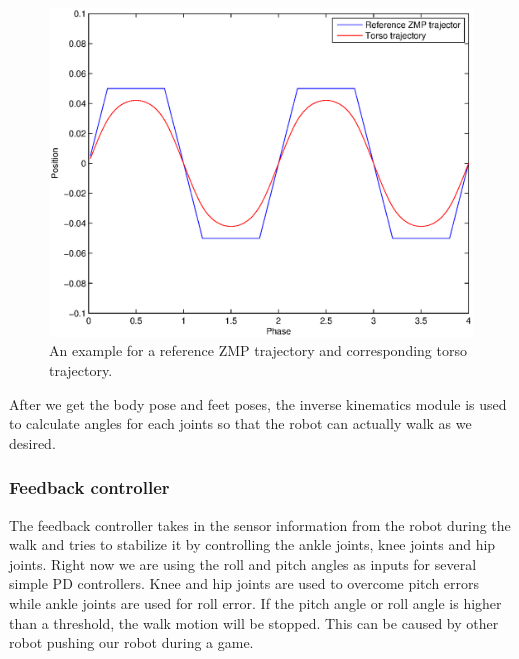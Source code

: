 \documentclass{article}
\begin{document}
\begin{figure}[H]
		\centering
		\includegraphics[width=1\textwidth]{figures/ZMP.eps}
		\caption{An example for a reference ZMP trajectory and corresponding torso trajectory.}
	\end{figure}
After we get the body pose and feet poses, the inverse kinematics module is used to calculate angles for each joints so that the robot can actually walk as we desired.

\subsubsection{Feedback controller}
	The feedback controller takes in the sensor information from the robot during the walk and tries to stabilize it by controlling the ankle joints, knee joints and hip joints. Right now we are using the roll and pitch angles as inputs for several simple PD controllers. Knee and hip joints are used to overcome pitch errors while ankle joints are used for roll error. If the pitch angle or roll angle is higher than a threshold, the walk motion will be stopped. This can be caused by other robot pushing our robot during a game.   
  
\end{document}

